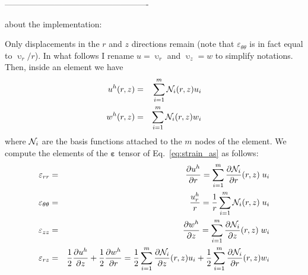 ----------------------------------------------------

{\color{purple} about the implementation:}

Only displacements in the $r$ and $z$ directions remain (note that $\varepsilon_{\theta\theta}$ is in fact equal to $\upupsilon_r/r$). In what follows I rename $u=\upupsilon_r$ and $\upupsilon_z=w$ to simplify notations. 
Then, inside an element we have 
\begin{eqnarray}
u^h(r,z) &=& \sum_{i=1}^m {\mathcal{N}}_i(r,z) u_i \nonumber\\
w^h(r,z) &=& \sum_{i=1}^m {\mathcal{N}}_i(r,z) w_i
\end{eqnarray}
where ${\mathcal{N}}_i$ are the basis functions attached 
to the $m$ nodes of the element.
We compute the elements of the ${\bm \varepsilon}$ tensor of Eq.~\eqref{eq:strain_as} as follows:
\begin{eqnarray}
\varepsilon_{rr} &=&
\frac{\partial u^h}{\partial r} 
= \sum_{i=1}^m \frac{\partial {\mathcal{N}}_i}{\partial r}(r,z) \; u_i \\
\varepsilon_{\theta\theta} &=& \frac{u_r^h}{r} = 
\frac{1}{r}\sum_{i=1}^m {\mathcal{N}}_i(r,z) \;  u_i \\
\varepsilon_{zz} &=& 
\frac{\partial w^h}{\partial z}
= \sum_{i=1}^m \frac{\partial {\mathcal{N}}_i}{\partial z}(r,z) \; w_i \\
\varepsilon_{rz} &=& \frac12\frac{\partial u^h}{\partial z}
+\frac12 \frac{\partial w^h}{\partial r}
= \frac12\sum_{i=1}^m \frac{\partial {\mathcal{N}}_i}{\partial z}(r,z) u_i 
+ \frac12\sum_{i=1}^m \frac{\partial {\mathcal{N}}_i}{\partial r}(r,z) w_i 
\end{eqnarray}


